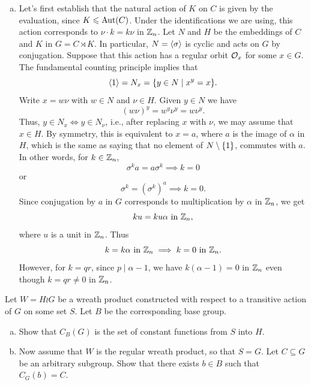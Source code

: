 \begin{solution}
\begin{enumerate}[a),font=\upshape]
    \item Let's first establish that the natural action of $K$ on $C$ is given by the evaluation, since $K\leqslant{\rm Aut}(C)$. Under the identifications we are using, this action corresponds to $\nu\cdot k=k\nu$ in $\mathbb{Z}_n$. Let $N$ and $H$ be the embeddings of $C$ and $K$ in $G=C\rtimes K$. In particular, $N=\langle\sigma\rangle$ is cyclic and acts on $G$ by conjugation. Suppose that this action has a regular orbit ${\cal O}_x$ for some $x\in G$. The fundamental counting principle implies that
    $$
        \langle1\rangle=N_x=\{y\in N\mid x^y=x\}.
    $$
    Write $x=w\nu$ with $w\in N$ and $\nu\in H$. Given $y\in N$ we have
    $$
        (w\nu)^y = w^y\nu^y=w\nu^y.
    $$
    Thus, $y\in N_x\iff y\in N_\nu$, i.e., after replacing $x$ with $\nu$, we may assume that $x\in H$. By symmetry, this is equivalent to $x=a$, where $a$ is the image of $\alpha$ in $H$, which is the same as saying that no element of $N\setminus\{1\}$, commutes with $a$. In other words, for $k\in\mathbb{Z}_n$,
    $$
        \sigma^ka=a\sigma^k\implies k=0
    $$
    or
    $$
        \sigma^k=(\sigma^k)^a\implies k=0.
    $$
    Since conjugation by $a$ in $G$ corresponds to multiplication by $\alpha$ in $\mathbb{Z}_n$, we get
    $$
        ku=ku\alpha\text{ in }\mathbb{Z}_n,
    $$
    where $u$ is a unit in $\mathbb{Z}_n$. Thus
    $$
        k=k\alpha\text{ in }\mathbb{Z}_n\implies k=0\text{ in }\mathbb{Z}_n.
    $$
    However, for $k=qr$, since $p\mid\alpha-1$, we have $k(\alpha-1)=0$ in $\mathbb{Z}_n$ even though $k=qr\ne0$ in $\mathbb{Z}_n$.
\end{enumerate}
\end{solution}

\begin{probl}
    Let\/ $W = H \wr G$ be a wreath product constructed with respect to a transitive action of\/ $G$ on some set\/ $S$. Let\/ $B$ be the corresponding base group.

    \begin{enumerate}[a),font=\upshape]
        \item Show that\/ $C_B(G)$ is the set of constant functions from\/ $S$ into\/ $H$.
        \item Now assume that\/ $W$ is the regular wreath product, so that\/ $S = G$. Let\/ $C \subseteq G$ be an arbitrary subgroup. Show that there exists\/ $b \in B$ such that\/ $C_G(b) = C$.
    \end{enumerate}
\end{probl}

